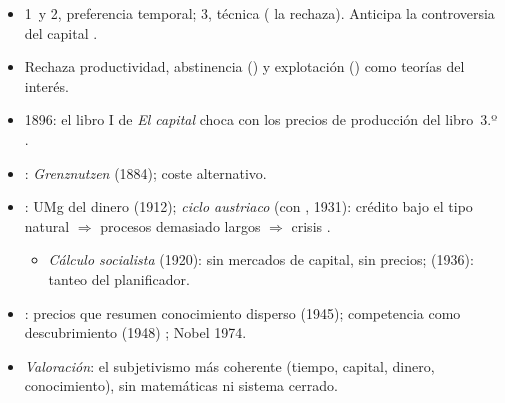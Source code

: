 \documentclass{article}
\begin{document}
\begin{columnas}
\begin{itemize}
\item 1~y 2, preferencia temporal; 3, técnica ( la rechaza). Anticipa la controversia del capital .
\item Rechaza productividad, abstinencia () y explotación () como teorías del interés.
\item 1896: el libro I de \emph{El capital} choca con los precios de producción del libro~3.º .
\end{itemize}
\begin{itemize}
\item {}: \emph{Grenznutzen} (1884); coste alternativo.
\item {}: UMg del dinero (1912); \emph{ciclo austriaco} (con , 1931): crédito bajo el tipo natural $\Rightarrow$ procesos demasiado largos $\Rightarrow$ crisis .
  \begin{itemize}
  \item \emph{Cálculo socialista} (1920): sin mercados de capital, sin precios;  (1936): tanteo del planificador.
  \end{itemize}
\item {}: precios que resumen conocimiento disperso (1945); competencia como descubrimiento (1948) ; Nobel 1974.
\item \emph{Valoración}: el subjetivismo más coherente (tiempo, capital, dinero, conocimiento), sin matemáticas ni sistema cerrado.
\end{itemize}


\end{columnas}
\end{document}
